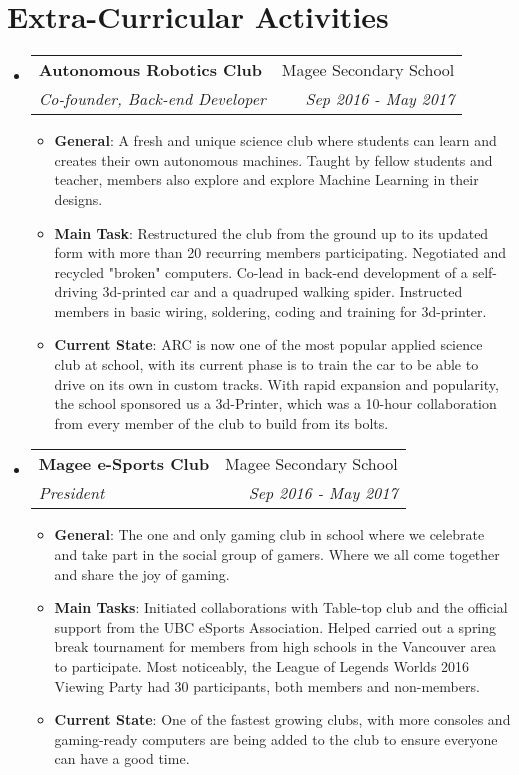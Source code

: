 \documentclass[letterpaper,10.5pt]{article}
\makeatletter
\newcommand{\resumeItem}[2]{
  \item\small{
    \textbf{#1}{: #2 \vspace{-2pt}}
  }
}
\newcommand{\resumeSubheading}[4]{
  \vspace{-1pt}\item
    \begin{tabular*}{0.97\textwidth}{l@{\extracolsep{\fill}}r}
      \textbf{#1} & #2 \\
      \textit{\small#3} & \textit{\small #4} \\
    \end{tabular*}\vspace{-5pt}
}
\newcommand{\resumeSubHeadingListStart}{\begin{itemize}[leftmargin=*]}
\newcommand{\resumeSubHeadingListEnd}{\end{itemize}}
\newcommand{\resumeItemListStart}{\begin{itemize}}
\newcommand{\resumeItemListEnd}{\end{itemize}\vspace{-5pt}}
\makeatother
\begin{document}
\section{Extra-Curricular Activities}
  \resumeSubHeadingListStart
    \resumeSubheading
      {Autonomous Robotics Club}{Magee Secondary School}
      {Co-founder, Back-end Developer}{Sep 2016 - May 2017}
      \resumeItemListStart
        \resumeItem{General}
        {A fresh and unique science club where students can learn and creates their own autonomous machines. Taught by fellow students and teacher, members also explore and explore Machine Learning in their designs.}
        \resumeItem{Main Task}
          {Restructured the club from the ground up to its updated form with more than 20 recurring members participating. Negotiated and recycled "broken" computers. Co-lead in back-end development of a self-driving 3d-printed car and a quadruped walking spider. Instructed members in basic wiring, soldering, coding and training for 3d-printer.}
        \resumeItem{Current State}
          {ARC is now one of the most popular applied science club at school, with its current phase is to train the car to be able to drive on its own in custom tracks. With rapid expansion and popularity, the school sponsored us a 3d-Printer, which was a 10-hour collaboration from every member of the club to build from its bolts.}
      \resumeItemListEnd

    \resumeSubheading
      {Magee e-Sports Club}{Magee Secondary School}
      {President}{Sep 2016 - May 2017}
      \resumeItemListStart
        \resumeItem{General}
          {The one and only gaming club in school where we celebrate and take part in the social group of gamers. Where we all come together and share the joy of gaming.}
        \resumeItem{Main Tasks}
          {Initiated collaborations with Table-top club and the official support from the UBC eSports Association. Helped carried out a spring break tournament for members from high schools in the Vancouver area to participate. Most noticeably, the League of Legends Worlds 2016 Viewing Party had 30 participants, both members and non-members.}
        \resumeItem{Current State}
          {One of the fastest growing clubs, with more consoles and gaming-ready computers are being added to the club to ensure everyone can have a good time.}
      \resumeItemListEnd
    \resumeSubHeadingListEnd

\end{document}

